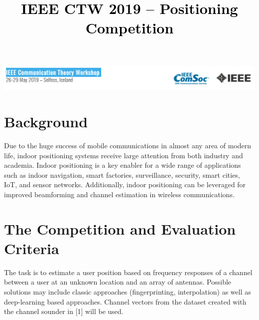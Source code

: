 \documentclass[letter]{moderncv} %
\title{\textbf{\textcolor{black}{IEEE CTW 2019 -- Positioning Competition}}} %
\begin{document}
\includegraphics[width=1\textwidth]{Comsoc}
\maketitle %
\vspace{-4ex}
\section{Background}
Due to the huge success of mobile communications in almost any area of modern life, indoor positioning systems   receive large attention from both industry and academia. 
Indoor positioning  is  a key enabler for a wide range of applications such as indoor navigation, smart factories, surveillance, security, smart cities, IoT, and sensor networks. 
Additionally, indoor positioning  can be leveraged for improved beamforming and  channel estimation in wireless communications. 






\section{The Competition and Evaluation Criteria}

The task is to estimate a user position based on frequency responses of a channel between a user at an unknown location and an array of antennas. 
Possible solutions may include classic approaches (fingerprinting, interpolation) as well as deep-learning based approaches. 
Channel vectors from  the dataset created with the channel sounder in [1] will be used.
\end{document}

